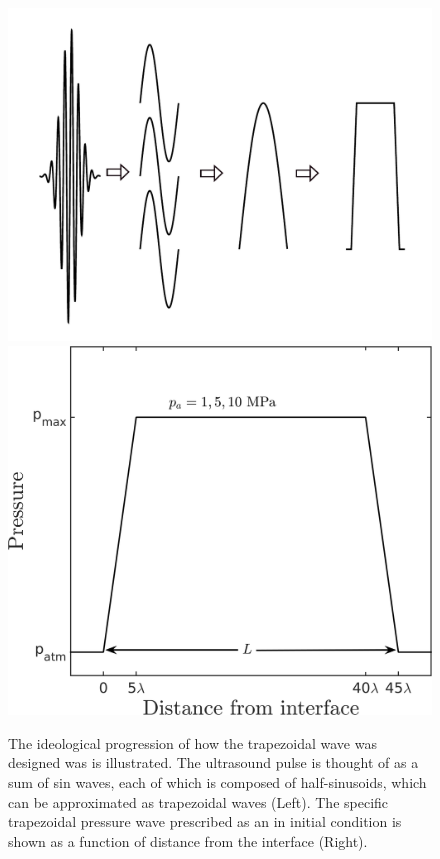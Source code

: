 \begin{figure}%
  \centering%
  \hfill
  \includegraphics[width=0.3\textheight]{./figs/lung_figs/wave_logic_schematic}\hfill
  \includegraphics[width=0.3\textheight]{./figs/lung_figs/p0_vs_y_labeled}%
  \caption[Trapezoidal wave]{The ideological progression of how the
    trapezoidal wave was designed was is illustrated. The
    ultrasound pulse is thought of as a sum of sin waves, each of
    which is composed of half-sinusoids, which can be approximated as
    trapezoidal waves (Left). The specific trapezoidal pressure wave prescribed as an
    in initial condition is shown as a function of distance from the
    interface (Right).}%
  \label{fig:p0}
\end{figure}
% 
